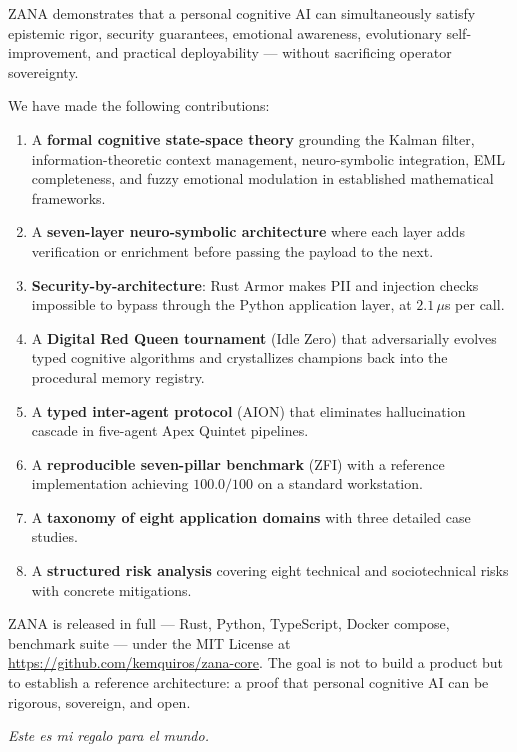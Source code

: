\documentclass[12pt,a4paper]{article}
\begin{document}
ZANA demonstrates that a personal cognitive AI can simultaneously satisfy epistemic rigor,
security guarantees, emotional awareness, evolutionary self-improvement, and practical
deployability --- without sacrificing operator sovereignty.

We have made the following contributions:

\begin{enumerate}[leftmargin=*, label=\arabic*.]
  \item A \textbf{formal cognitive state-space theory} grounding the Kalman filter,
    information-theoretic context management, neuro-symbolic integration, EML completeness,
    and fuzzy emotional modulation in established mathematical frameworks.
  \item A \textbf{seven-layer neuro-symbolic architecture} where each layer adds
    verification or enrichment before passing the payload to the next.
  \item \textbf{Security-by-architecture}: Rust Armor makes PII and injection checks
    impossible to bypass through the Python application layer, at $2.1\,\mu$s per call.
  \item A \textbf{Digital Red Queen tournament} (Idle Zero) that adversarially evolves
    typed cognitive algorithms and crystallizes champions back into the procedural
    memory registry.
  \item A \textbf{typed inter-agent protocol} (AION) that eliminates hallucination cascade
    in five-agent Apex Quintet pipelines.
  \item A \textbf{reproducible seven-pillar benchmark} (ZFI) with a reference implementation
    achieving $100.0/100$ on a standard workstation.
  \item A \textbf{taxonomy of eight application domains} with three detailed case studies.
  \item A \textbf{structured risk analysis} covering eight technical and sociotechnical risks
    with concrete mitigations.
\end{enumerate}

ZANA is released in full --- Rust, Python, TypeScript, Docker compose, benchmark suite ---
under the MIT License at \url{https://github.com/kemquiros/zana-core}. The goal is not to
build a product but to establish a reference architecture: a proof that personal cognitive AI
can be rigorous, sovereign, and open.

\bigskip
\begin{center}
{\large\itshape Este es mi regalo para el mundo.}
\end{center}
\end{document}
